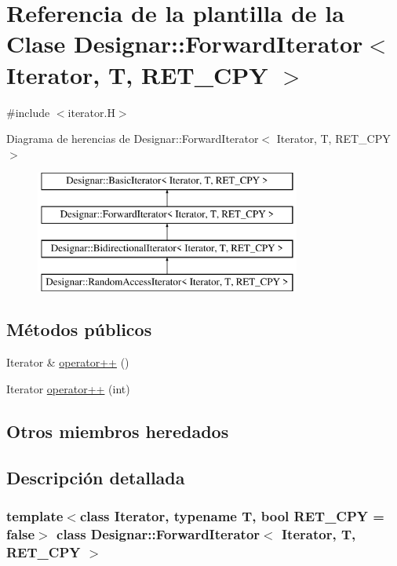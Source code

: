 \hypertarget{class_designar_1_1_forward_iterator}{}\section{Referencia de la plantilla de la Clase Designar\+:\+:Forward\+Iterator$<$ Iterator, T, R\+E\+T\+\_\+\+C\+PY $>$}
\label{class_designar_1_1_forward_iterator}


{\ttfamily \#include $<$iterator.\+H$>$}

Diagrama de herencias de Designar\+:\+:Forward\+Iterator$<$ Iterator, T, R\+E\+T\+\_\+\+C\+PY $>$\begin{figure}[H]
\begin{center}
\leavevmode
\includegraphics[height=4.000000cm]{class_designar_1_1_forward_iterator}
\end{center}
\end{figure}
\subsection*{Métodos públicos}
\begin{DoxyCompactItemize}
\item 
Iterator \& \hyperlink{class_designar_1_1_forward_iterator_a021a9305def76c968872089a778d2b41}{operator++} ()
\item 
Iterator \hyperlink{class_designar_1_1_forward_iterator_a7182625f3375ba05868ae6f240628b1c}{operator++} (int)
\end{DoxyCompactItemize}
\subsection*{Otros miembros heredados}


\subsection{Descripción detallada}
\subsubsection*{template$<$class Iterator, typename T, bool R\+E\+T\+\_\+\+C\+PY = false$>$\newline
class Designar\+::\+Forward\+Iterator$<$ Iterator, T, R\+E\+T\+\_\+\+C\+P\+Y $>$}



